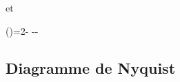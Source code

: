 et
\begin{bequation}
\phi(\omega)=2\arctan{\tau_3\omega}-\arctan{\tau_1\omega}
             -\arctan{\tau_2\omega}-\arctan{\tau_4\omega} 
\end{bequation}
\clearpage

\captionsetup{width=0.9\linewidth}
\subsection{Diagramme de Nyquist}
